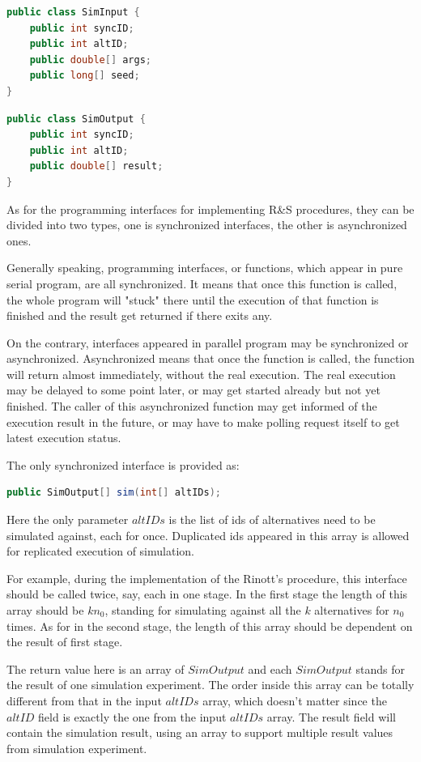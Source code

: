 \begin{lstlisting}[language=Java]
public class SimInput {
	public int syncID;
	public int altID;
	public double[] args;
	public long[] seed;
}
\end{lstlisting}

\begin{lstlisting}[language=Java]
public class SimOutput {
	public int syncID;
	public int altID;
	public double[] result;
}
\end{lstlisting}

As for the programming interfaces for implementing R\&S procedures, they can be divided into two types, one is synchronized interfaces, the other is asynchronized ones.

Generally speaking, programming interfaces, or functions, which appear in pure serial program, are all synchronized. It means that once this function is called, the whole program will "stuck" there until the execution of that function is finished and the result get returned if there exits any.

On the contrary, interfaces appeared in parallel program may be synchronized or asynchronized. Asynchronized means that once the function is called, the function will return almost immediately, without the real execution. The real execution may be delayed to some point later, or may get started already but not yet finished. The caller of this asynchronized function may get informed of the execution result in the future, or may have to make polling request itself to get latest execution status.

The only synchronized interface is provided as:

\begin{lstlisting}[language=Java]
public SimOutput[] sim(int[] altIDs);
\end{lstlisting}

Here the only parameter $altIDs$ is the list of ids of alternatives need to be simulated against, each for once. Duplicated ids appeared in this array is allowed for replicated execution of simulation.

For example, during the implementation of the Rinott's procedure, this interface should be called twice, say, each in one stage. In the first stage the length of this array should be $kn_0$, standing for simulating against all the $k$ alternatives for $n_0$ times. As for in the second stage, the length of this array should be dependent on the result of first stage.

The return value here is an array of $SimOutput$ and each $SimOutput$ stands for the result of one simulation experiment. The order inside this array can be totally different from that in the input $altIDs$ array, which doesn't matter since the $altID$ field is exactly the one from the input $altIDs$ array. The result field will contain the simulation result, using an array to support multiple result values from simulation experiment.

